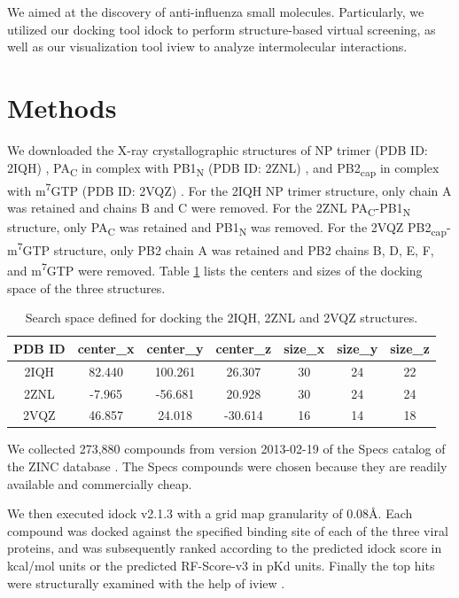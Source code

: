 We aimed at the discovery of anti-influenza small molecules. Particularly, we utilized our docking tool idock \citep{1153,1362} to perform structure-based virtual screening, as well as our visualization tool iview \citep{1366} to analyze intermolecular interactions.

\section{Methods}

We downloaded the X-ray crystallographic structures of NP trimer (PDB ID: 2IQH) \citep{1140}, PA\textsubscript{C} in complex with PB1\textsubscript{N} (PDB ID: 2ZNL) \citep{1141}, and PB2\textsubscript{cap} in complex with m\textsuperscript{7}GTP (PDB ID: 2VQZ) \citep{1192}. For the 2IQH NP trimer structure, only chain A was retained and chains B and C were removed. For the 2ZNL PA\textsubscript{C}-PB1\textsubscript{N} structure, only PA\textsubscript{C} was retained and PB1\textsubscript{N} was removed. For the 2VQZ PB2\textsubscript{cap}-m\textsuperscript{7}GTP structure, only PB2 chain A was retained and PB2 chains B, D, E, F, and m\textsuperscript{7}GTP were removed. Table \ref{influenza:SearchSpace} lists the centers and sizes of the docking space of the three structures.

\begin{table}
\caption{Search space defined for docking the 2IQH, 2ZNL and 2VQZ structures.}
\label{influenza:SearchSpace}
\begin{tabular}{ccccccc}
\hline
PDB ID & center\_x & center\_y & center\_z & size\_x & size\_y & size\_z\\
\hline
2IQH & 82.440 & 100.261 & 26.307 & 30 & 24 & 22\\
2ZNL & -7.965 & -56.681 & 20.928 & 30 & 24 & 24\\
2VQZ & 46.857 & 24.018 & -30.614 & 16 & 14 & 18\\
\hline
\end{tabular}
\end{table}

We collected 273,880 compounds from version 2013-02-19 of the Specs catalog of the ZINC database \citep{532,1178}. The Specs compounds were chosen because they are readily available and commercially cheap.

We then executed idock v2.1.3 \citep{1362} with a grid map granularity of 0.08\AA. Each compound was docked against the specified binding site of each of the three viral proteins, and was subsequently ranked according to the predicted idock score in kcal/mol units or the predicted RF-Score-v3 in pKd units. Finally the top hits were structurally examined with the help of iview \citep{1366}.

